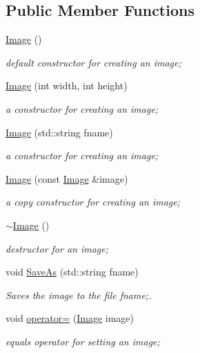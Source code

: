\subsection*{Public Member Functions}
\begin{DoxyCompactItemize}
\item 
\hyperlink{classImage_a58edd1c45b4faeb5f789b0d036d02313}{Image} ()
\begin{DoxyCompactList}\small\item\em default constructor for creating an image; \end{DoxyCompactList}\item 
\hyperlink{classImage_afb0339b802ed560e69eb07358d30198f}{Image} (int width, int height)
\begin{DoxyCompactList}\small\item\em a constructor for creating an image; \end{DoxyCompactList}\item 
\hyperlink{classImage_a5ab2d611b6c128521a51380c25843f49}{Image} (std\+::string fname)
\begin{DoxyCompactList}\small\item\em a constructor for creating an image; \end{DoxyCompactList}\item 
\hyperlink{classImage_a34410a36b132ab597a8878d45facc89a}{Image} (const \hyperlink{classImage}{Image} \&image)
\begin{DoxyCompactList}\small\item\em a copy constructor for creating an image; \end{DoxyCompactList}\item 
\hyperlink{classImage_a0294f63700543e11c0f0da85601c7ae5}{$\sim$\+Image} ()
\begin{DoxyCompactList}\small\item\em destructor for an image; \end{DoxyCompactList}\item 
void \hyperlink{classImage_a7884b109eec6cdc52295011f4e0552fd}{Save\+As} (std\+::string fname)
\begin{DoxyCompactList}\small\item\em Saves the image to the file fname;. \end{DoxyCompactList}\item 
void \hyperlink{classImage_ad87aee5af20779f84891b08b23319ce2}{operator=} (\hyperlink{classImage}{Image} image)
\begin{DoxyCompactList}\small\item\em equals operator for setting an image; \end{DoxyCompactList}\item 

\end{DoxyCompactItemize}
